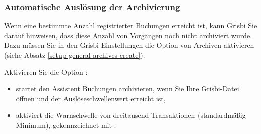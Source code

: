\subsubsection{Automatische Auslösung der Archivierung\label{datamanagement-archive-auto}}

Wenn eine bestimmte Anzahl registrierter Buchungen erreicht ist, kann Grisbi Sie darauf hinweisen, dass diese Anzahl von Vorgängen noch nicht archiviert wurde. Dazu müssen Sie in den Grisbi-Einstellungen die Option  von Archiven aktivieren (siehe Absatz \vref{setup-general-archives-create}).

Aktivieren Sie die Option :
\begin{itemize}
	\item startet den Assistent Buchungen archivieren, wenn Sie Ihre Grisbi-Datei öffnen und der Auslöseschwellenwert erreicht ist,
	\item aktiviert die Warnschwelle von dreitausend Transaktionen (standardmäßig Minimum), gekennzeichnet mit .
\end{itemize}

